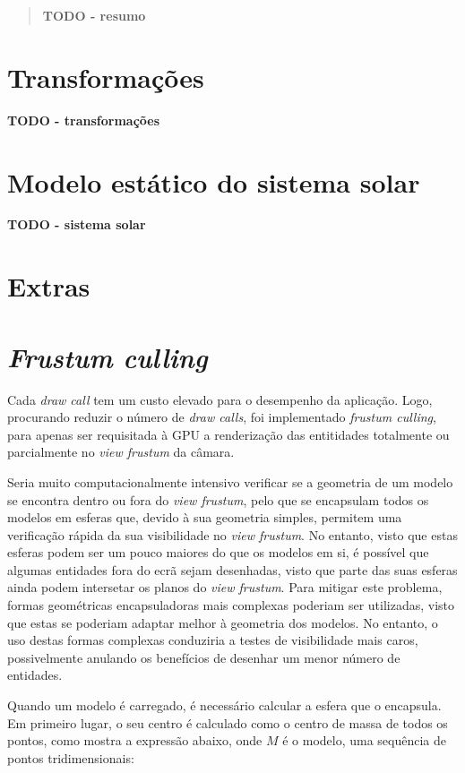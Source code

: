 \documentclass[12pt, a4paper]{article}
\begin{document}
\pagebreak

\begin{abstract}
    \textbf{\color{red} TODO - resumo}
\end{abstract}

\section{Transformações}

\textbf{\color{red} TODO - transformações}

\section{Modelo estático do sistema solar}

\textbf{\color{red} TODO - sistema solar}

\section{Extras}

\section{\emph{Frustum culling}}

Cada \emph{draw call} tem um custo elevado para o desempenho da aplicação. Logo, procurando reduzir
o número de \emph{draw calls}, foi implementado \emph{frustum culling}, para apenas ser requisitada
à GPU a renderização das entitidades totalmente ou parcialmente no \emph{view frustum} da câmara.

Seria muito computacionalmente intensivo verificar se a geometria de um modelo se encontra dentro ou
fora do \emph{view frustum}, pelo que se encapsulam todos os modelos em esferas que, devido à sua
geometria simples, permitem uma verificação rápida da sua visibilidade no \emph{view frustum}. No
entanto, visto que estas esferas podem ser um pouco maiores do que os modelos em si, é possível que
algumas entidades fora do ecrã sejam desenhadas, visto que parte das suas esferas ainda podem
intersetar os planos do \emph{view frustum}. Para mitigar este problema, formas geométricas
encapsuladoras mais complexas poderiam ser utilizadas, visto que estas se poderiam adaptar melhor à
geometria dos modelos. No entanto, o uso destas formas complexas conduziria a testes de visibilidade
mais caros, possivelmente anulando os benefícios de desenhar um menor número de entidades.

Quando um modelo é carregado, é necessário calcular a esfera que o encapsula. Em primeiro lugar, o
seu centro é calculado como o centro de massa de todos os pontos, como mostra a expressão abaixo,
onde $M$ é o modelo, uma sequência de pontos tridimensionais:
\end{document}
